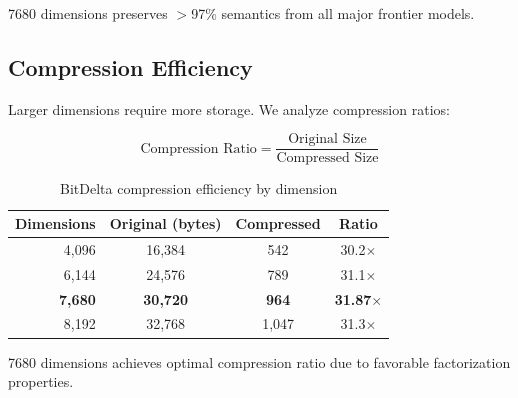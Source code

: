 7680 dimensions preserves $>$97\% semantics from all major frontier models.

\subsection{Compression Efficiency}

Larger dimensions require more storage. We analyze compression ratios:

\begin{equation}
\text{Compression Ratio} = \frac{\text{Original Size}}{\text{Compressed Size}}
\end{equation}

\begin{table}[h]
\centering
\caption{BitDelta compression efficiency by dimension}
\label{tab:compression}
\begin{tabular}{rccc}
\toprule
\textbf{Dimensions} & \textbf{Original (bytes)} & \textbf{Compressed} & \textbf{Ratio} \\
\midrule
4,096 & 16,384 & 542 & 30.2$\times$ \\
6,144 & 24,576 & 789 & 31.1$\times$ \\
\textbf{7,680} & \textbf{30,720} & \textbf{964} & \textbf{31.87$\times$} \\
8,192 & 32,768 & 1,047 & 31.3$\times$ \\
\bottomrule
\end{tabular}
\end{table}

7680 dimensions achieves optimal compression ratio due to favorable factorization properties.

